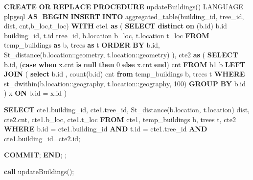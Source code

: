 \documentclass[11pt]{article}
\newenvironment{Shaded}{}{}
\newcommand{\KeywordTok}[1]{\textcolor[rgb]{0.00,0.44,0.13}{\textbf{{#1}}}}
\newcommand{\DecValTok}[1]{\textcolor[rgb]{0.25,0.63,0.44}{{#1}}}
\newcommand{\CharTok}[1]{\textcolor[rgb]{0.25,0.44,0.63}{{#1}}}
\newcommand{\FunctionTok}[1]{\textcolor[rgb]{0.02,0.16,0.49}{{#1}}}
\newcommand{\NormalTok}[1]{{#1}}
\begin{document}
    \begin{Shaded}
\begin{Highlighting}[]

\KeywordTok{CREATE} \KeywordTok{OR} \KeywordTok{REPLACE} \KeywordTok{PROCEDURE}\NormalTok{ updateBuildings()}
\NormalTok{LANGUAGE plpgsql    }
\KeywordTok{AS}\NormalTok{ $$}
\KeywordTok{BEGIN}
    \KeywordTok{INSERT} \KeywordTok{INTO}\NormalTok{ aggregated_table(building_id, tree_id, dist, cnt,b_loc,t_loc) }
\KeywordTok{WITH}
\NormalTok{cte1 }\KeywordTok{as}\NormalTok{ (}
         \KeywordTok{SELECT} 
            \KeywordTok{distinct} \KeywordTok{on}\NormalTok{ (b.id)  b.id building_id,}
\NormalTok{            t.id tree_id,}
\NormalTok{            b.location b_loc,}
\NormalTok{            t.location t_loc}
        \KeywordTok{FROM}\NormalTok{ temp_buildings }\KeywordTok{as}\NormalTok{ b,}
\NormalTok{             trees }\KeywordTok{as}\NormalTok{ t}
        \KeywordTok{ORDER} \KeywordTok{BY}\NormalTok{ b.id, St_distance(b.location:}\CharTok{:geometry}\NormalTok{, t.location:}\CharTok{:geometry}\NormalTok{)  }
\NormalTok{        ),  }
\NormalTok{cte2 }\KeywordTok{as}\NormalTok{ (}
        \KeywordTok{SELECT}\NormalTok{ b.id, (}\KeywordTok{case} \KeywordTok{when}\NormalTok{ x.cnt }\KeywordTok{is} \KeywordTok{null} \KeywordTok{then} \DecValTok{0} \KeywordTok{else}\NormalTok{ x.cnt }\KeywordTok{end}\NormalTok{) cnt}
        \KeywordTok{FROM}\NormalTok{ b1 b }\KeywordTok{LEFT} \KeywordTok{JOIN}
\NormalTok{        (}
            \KeywordTok{select}\NormalTok{ b.id , }\FunctionTok{count}\NormalTok{(b.id) cnt }\KeywordTok{from}
\NormalTok{            temp_buildings b, }
\NormalTok{            trees t}
            \KeywordTok{WHERE}\NormalTok{ st_dwithin(b.location:}\CharTok{:geography}\NormalTok{, t.location:}\CharTok{:geography}\NormalTok{, }\DecValTok{100}\NormalTok{)}
            \KeywordTok{GROUP} \KeywordTok{BY}\NormalTok{ b.id}
\NormalTok{        ) x}
        \KeywordTok{ON}\NormalTok{ b.id = x.id}
\NormalTok{)}
 
\KeywordTok{SELECT} 
\NormalTok{    cte1.building_id,}
\NormalTok{    cte1.tree_id,}
\NormalTok{    St_distance(b.location, t.location) dist,}
\NormalTok{    cte2.cnt,}
\NormalTok{    cte1.b_loc,}
\NormalTok{    cte1.t_loc}
\KeywordTok{FROM}\NormalTok{ cte1, }
\NormalTok{      temp_buildings b, }
\NormalTok{      trees t, }
\NormalTok{      cte2    }
\KeywordTok{WHERE}\NormalTok{ b.id = cte1.building_id}
  \KeywordTok{AND}\NormalTok{ t.id = cte1.tree_id}
  \KeywordTok{AND}\NormalTok{ cte1.building_id=cte2.id;}
 
    \KeywordTok{COMMIT}\NormalTok{;}
\KeywordTok{END}\NormalTok{;}
\NormalTok{$$;}


\KeywordTok{call}\NormalTok{ updateBuildings();}

\end{Highlighting}
\end{Shaded}
\end{document}
